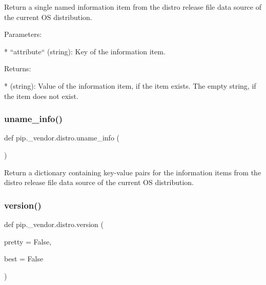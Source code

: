 \begin{DoxyVerb}Return a single named information item from the distro release file
data source of the current OS distribution.

Parameters:

* ``attribute`` (string): Key of the information item.

Returns:

* (string): Value of the information item, if the item exists.
            The empty string, if the item does not exist.
\end{DoxyVerb}
 \mbox{\label{namespacepip_1_1__vendor_1_1distro_af7bba6d8298bb220d1615d8cdf5ebb09}} 
\subsubsection{\texorpdfstring{uname\+\_\+info()}{uname\_info()}}
{\footnotesize\ttfamily def pip.\+\_\+vendor.\+distro.\+uname\+\_\+info (\begin{DoxyParamCaption}{ }\end{DoxyParamCaption})}

\begin{DoxyVerb}Return a dictionary containing key-value pairs for the information items
from the distro release file data source of the current OS distribution.
\end{DoxyVerb}
 \mbox{\label{namespacepip_1_1__vendor_1_1distro_a0f7a78ea940419ee27cd0b0a5694be3e}} 
\subsubsection{\texorpdfstring{version()}{version()}}
{\footnotesize\ttfamily def pip.\+\_\+vendor.\+distro.\+version (\begin{DoxyParamCaption}\item[{}]{pretty = {\ttfamily False},  }\item[{}]{best = {\ttfamily False} }\end{DoxyParamCaption})}

